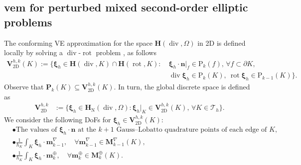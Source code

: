 \documentclass[fleqn,a4paper]{cas-sc}
\newcommand\vdiv{\mathop{\mathrm{div}}\nolimits}
\newcommand\vrot{\mathop{\mathrm{rot}}\nolimits}
\newcommand{\bn}{\boldsymbol{n}}
\newcommand{\bm}{\mathbf{m}}
\newcommand{\bxi}{\boldsymbol{\xi}}
\newcommand{\0}{\boldsymbol{0}}
\newcommand\cT{\mathcal{T}}
\newcommand\bP{\mathbf{P}}
\newcommand\bM{\mathbf{M}}
\newcommand\bV{\mathbf{V}}
\newcommand\rP{\mathrm{P}}
\newcommand\bH{\mathbf{H}}
\numberwithin{equation}{section}
\numberwithin{figure}{section}
\begin{document}
\subsection{\gls{vem} for perturbed mixed second-order elliptic problems}\label{sec:MixedVEM} The conforming VE approximation for the space  $\bH(\vdiv,\Omega)$ in 2D is defined locally by solving a $\vdiv$-$\vrot$ problem \cite{beirao16}, as follows  
\begin{align*}
    \bV_{\text{2D}}^{h,k}(K) := \{ \bxi_h\in \bH(\vdiv,K)\cap \bH(\vrot,K) \colon\ &\bxi_h\cdot \bn|_{{f}}\in \rP_{k}(f),\, \forall f\subset \partial K, \\
    &\vdiv\bxi_h \in \rP_{k}(K), \ \vrot\bxi_h \in \rP_{k-1}(K)\}.
\end{align*}
Observe that $\bP_{k}(K)\subseteq \bV_{\text{2D}}^{h,k}(K)$. In turn, the global discrete space is defined as 
\begin{align*}
    \bV_{\text{2D}}^{h,k} &:= \{ \bxi_h \in \bH_{\mathrm{N}}(\vdiv,\Omega) \colon \bxi_h|_K \in \bV_{\text{2D}}^{h,k}(K) ,\, \forall K\in \cT_h \}.
\end{align*}
We consider the following DoFs for $\bxi_h\in \bV_{\text{2D}}^{h,k}(K)$:
\begin{align*}
    &\bullet \text{The values of } \bxi_h\cdot \bn \text{ at the $k+1$ Gauss--Lobatto quadrature points of each edge of $K$}, \\
    &\bullet \frac{1}{h_K}\int_K \bxi_h\cdot \bm_{k-1}^\nabla ,\quad \forall \bm_{k-1}^{\nabla} \in \bM_{k-1}^{\nabla}(K),\\
    &\bullet \frac{1}{h_K}\int_K \bxi_h \cdot \bm_{k}^{\oplus} ,\quad \forall \bm_{k}^{\oplus} \in \bM_{k}^{\oplus}(K).
\end{align*}
\end{document}
